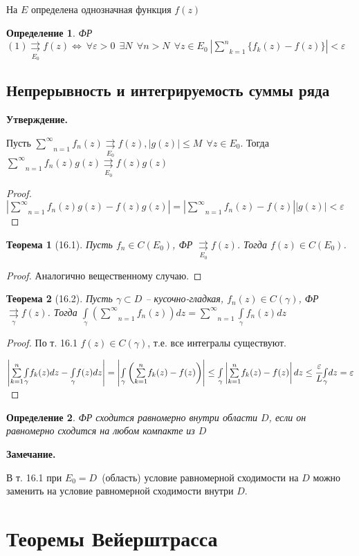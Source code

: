 \documentclass[draft]{article}
\newcommand{\rra}{\rightrightarrows}
\newcommand{\rrae}[1]{\underset{#1}{\rightrightarrows}}
\newcommand{\mint}[2]{\underset{#1}{\overset{#2}{\int}}}
\newcommand{\msum}[2]{\underset{#1}{\overset{#2}{\sum}}}
\newcommand{\LRA}{\Leftrightarrow}
\newcommand{\g}{\gamma}
\newcommand{\e}{\varepsilon}
\newcommand{\E}{\ \exists}
\newcommand{\F}{\ \forall}
\newcommand{\opr}[1]{\begin{opred}#1\end{opred}}
\newtheorem*{theor}{Теорема}
\newtheorem*{opred}{Определение}
\theoremstyle{remark}
\begin{document}
На $E$ определена однозначная функция $f(z)$

\opr{ФР $(1)\underset{E_0}{\rra}f(z)\LRA \F \e>0\ \E N\ \F n>N\ \F z\in E_0\ \left|\msum{k=1}{n}\{f_k(z)-f(z)\}\right|<\e$}

\subsection{Непрерывность и интегрируемость суммы ряда}

{\bfseries Утверждение.}

Пусть $\msum{n=1}{\infty}f_n(z)\rrae{E_0}f(z), |g(z)|\leq M\ \F z\in E_0$. Тогда $\msum{n=1}{\infty}f_n(z)g(z)\rrae{E_0}f(z)g(z)$
\begin{proof}
$|\msum{n=1}{\infty}f_n(z)g(z)-f(z)g(z)|=|\msum{n=1}{\infty}f_n(z)-f(z)||g(z)|<\e$
\end{proof}

\begin{theor}[16.1]
Пусть $f_n\in C(E_0)$, ФР $\rrae{E_0}f(z)$. Тогда $f(z)\in C(E_0)$.
\end{theor}
\begin{proof}
Аналогично вещественному случаю.
\end{proof}

\begin{theor}[16.2]
Пусть $\g\subset D$ -- кусочно-гладкая, $f_n(z)\in C(\g)$, ФР$\rrae{\g}f(z)$. Тогда $\mint{\g}{}\left(\msum{n=1}{\infty}f_n(z)\right)dz=\msum{n=1}{\infty}\mint{\g}{}f_n(z)dz$
\end{theor}
\begin{proof}
По т. 16.1 $f(z)\in C(\g)$, т.е. все интегралы существуют.

$\left|\msum{k=1}{n}\mint{\g}{}f_k(z)dz-\mint{\g}{}f(z)dz\right|=\left|\mint{\g}{}\left(\msum{k=1}{n}f_k(z)-f(z)\right)\right|\leq\mint{\g}{}\left|\msum{k=1}{n}f_k(z)-f(z)\right|dz\leq\cfrac \e L\mint{\g}{}dz=\e$
\end{proof}

\opr{ФР сходится равномерно внутри области $D$, если он равномерно сходится на любом компакте из $D$}

{\bfseries Замечание.}

В т. 16.1 при $E_0=D$~(область) условие равномерной сходимости на $D$ можно заменить на условие равномерной сходимости внутри $D$.

\newpage

\section{Теоремы Вейерштрасса}
\end{document}
